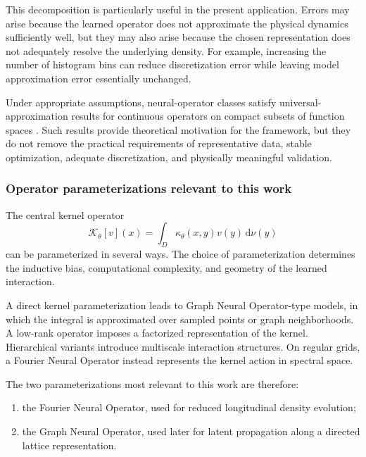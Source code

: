 \documentclass[11pt,a4paper]{article}
\providecommand{\dd}{\,\mathrm{d}}
\begin{document}
\begin{sloppypar}
This decomposition is particularly useful in the present application. Errors may arise because the learned operator does not approximate the physical dynamics sufficiently well, but they may also arise because the chosen representation does not adequately resolve the underlying density. For example, increasing the number of histogram bins can reduce discretization error while leaving model approximation error essentially unchanged.

Under appropriate assumptions, neural-operator classes satisfy universal-approximation results for continuous operators on compact subsets of function spaces \cite{kovachki_neural_2023}. Such results provide theoretical motivation for the framework, but they do not remove the practical requirements of representative data, stable optimization, adequate discretization, and physically meaningful validation.

\subsubsection{Operator parameterizations relevant to this work}
\label{subsubsec:NO_parameterizations}

The central kernel operator
\begin{equation}
\mathcal{K}_{\theta}[v](x)
=
\int_D
\kappa_{\theta}(x,y)
v(y)
\dd\nu(y)
\end{equation}
can be parameterized in several ways. The choice of parameterization determines the inductive bias, computational complexity, and geometry of the learned interaction.

A direct kernel parameterization leads to Graph Neural Operator-type models, in which the integral is approximated over sampled points or graph neighborhoods. A low-rank operator imposes a factorized representation of the kernel. Hierarchical variants introduce multiscale interaction structures. On regular grids, a Fourier Neural Operator instead represents the kernel action in spectral space.

The two parameterizations most relevant to this work are therefore:

\begin{enumerate}[label=(\roman*)]
\item the Fourier Neural Operator, used for reduced longitudinal density evolution;
\item the Graph Neural Operator, used later for latent propagation along a directed lattice representation.
\end{enumerate}


\end{sloppypar}
\end{document}
